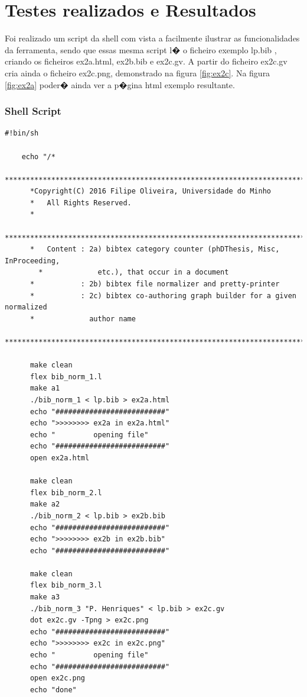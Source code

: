 \documentclass{report}
\begin{document}




      \section{Testes realizados e Resultados}
    Foi realizado um script da shell com vista a facilmente ilustrar as funcionalidades da ferramenta, sendo que essas mesma script l� o ficheiro exemplo lp.bib , criando os ficheiros ex2a.html, ex2b.bib e ex2c.gv. A partir do ficheiro ex2c.gv cria ainda o ficheiro ex2c.png, demonstrado na figura \ref{fig:ex2c}. 
      Na figura \ref{fig:ex2a} poder� ainda ver a p�gina html exemplo resultante.

      \subsubsection{Shell Script}
    \begin{lstlisting}
#!bin/sh

    echo "/*
      ********************************************************************************
      *Copyright(C) 2016 Filipe Oliveira, Universidade do Minho
      *   All Rights Reserved.
      *
      ********************************************************************************
      *   Content : 2a) bibtex category counter (phDThesis, Misc, InProceeding,
        *             etc.), that occur in a document
      *           : 2b) bibtex file normalizer and pretty-printer
      *           : 2c) bibtex co-authoring graph builder for a given normalized 
      *             author name 
      ********************************************************************************/"

      make clean
      flex bib_norm_1.l
      make a1
      ./bib_norm_1 < lp.bib > ex2a.html
      echo "##########################"
      echo ">>>>>>>> ex2a in ex2a.html"
      echo "         opening file"
      echo "##########################"
      open ex2a.html

      make clean
      flex bib_norm_2.l
      make a2
      ./bib_norm_2 < lp.bib > ex2b.bib
      echo "##########################"
      echo ">>>>>>>> ex2b in ex2b.bib"
      echo "##########################"

      make clean
      flex bib_norm_3.l
      make a3
      ./bib_norm_3 "P. Henriques" < lp.bib > ex2c.gv
      dot ex2c.gv -Tpng > ex2c.png
      echo "##########################"
      echo ">>>>>>>> ex2c in ex2c.png"
      echo "         opening file"
      echo "##########################"
      open ex2c.png
      echo "done"
      \end{lstlisting}
\end{document}

